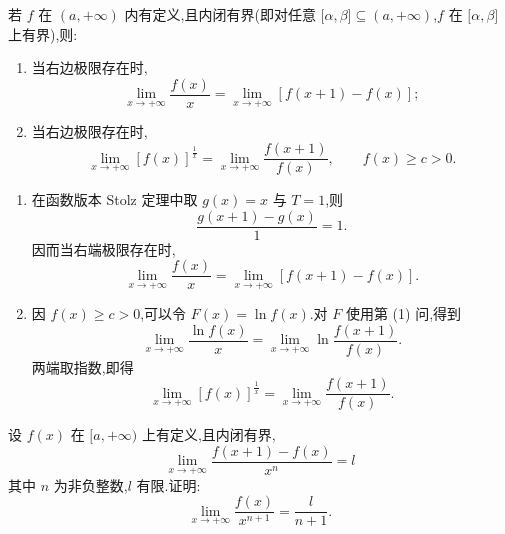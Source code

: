 \begin{example}[Cauchy 定理]
    若 $f$ 在 $(a,+\infty)$ 内有定义,且内闭有界(即对任意 $\lbrack \alpha,\beta\rbrack\subseteq(a,+\infty)$,$f$ 在 $\lbrack \alpha,\beta\rbrack$ 上有界),则:
    \begin{enumerate}
        \item 当右边极限存在时,
              \[
                  \displaystyle\lim\limits_{x\to+\infty}\dfrac{f(x)}{x}
                  =\lim\limits_{x\to+\infty}[f(x+1)-f(x)];
              \]
        \item 当右边极限存在时,
              \[
                  \displaystyle\lim\limits_{x\to+\infty}[f(x)]^{\frac{1}{x}}
                  =\lim\limits_{x\to+\infty}\dfrac{f(x+1)}{f(x)},
                  \qquad f(x)\geq c>0.
              \]
    \end{enumerate}
\end{example}
\exampleblank

\begin{solution}
    \leavevmode
    \begin{enumerate}
        \item 在函数版本 Stolz 定理中取 $g(x)=x$ 与 $T=1$,则
              \[
                  \dfrac{g(x+1)-g(x)}{1}=1.
              \]
              因而当右端极限存在时,
              \[
                  \displaystyle\lim\limits_{x\to+\infty}\dfrac{f(x)}{x}
                  =\lim\limits_{x\to+\infty}[f(x+1)-f(x)].
              \]
        \item 因 $f(x)\geq c>0$,可以令 $F(x)=\ln f(x)$.对 $F$ 使用第 (1) 问,得到
              \[
                  \displaystyle\lim\limits_{x\to+\infty}\dfrac{\ln f(x)}{x}
                  =\lim\limits_{x\to+\infty}
                  \ln\dfrac{f(x+1)}{f(x)}.
              \]
              两端取指数,即得
              \[
                  \displaystyle\lim\limits_{x\to+\infty}[f(x)]^{\frac{1}{x}}
                  =\lim\limits_{x\to+\infty}\dfrac{f(x+1)}{f(x)}.
              \]
    \end{enumerate}
\end{solution}

\begin{example}
    设 $f(x)$ 在 $\lbrack a,+\infty)$ 上有定义,且内闭有界,
    \[
        \displaystyle\lim\limits_{x\to+\infty}
        \dfrac{f(x+1)-f(x)}{x^n}=l
    \]
    其中 $n$ 为非负整数,$l$ 有限.证明:
    \[
        \displaystyle\lim\limits_{x\to+\infty}\dfrac{f(x)}{x^{n+1}}
        =\dfrac{l}{n+1}.
    \]
\end{example}
\exampleblank

